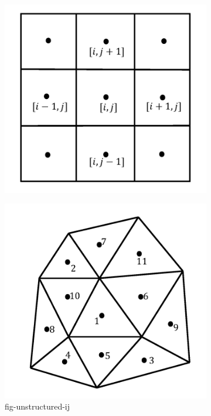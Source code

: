 \begin{figure}
  \centering
  \begin{subfigure}{0.5\linewidth}
    \centering
    \includegraphics[width=0.8\linewidth]{img/intro/mStructured.png}
    \caption{}
    \label{fig-structured-ij}
  \end{subfigure}%
  \begin{subfigure}{0.5\linewidth}
    \centering
    \includegraphics[width=0.8\linewidth]{img/intro/mUnstructured.png}
    \caption{fig-unstructured-ij}
    \label{fig-unstructured}
  \end{subfigure}%
  \caption{}
  \label{fig-structured-unstructured}
\end{figure}

